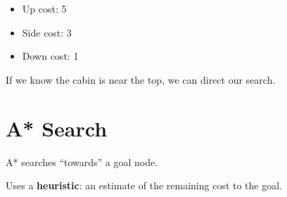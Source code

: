 \documentclass{article}
\begin{document}
\begin{itemize}[noitemsep]
    \item Up cost: 5
    \item Side cost: 3
    \item Down cost: 1
\end{itemize}

If we know the cabin is near the top, we can direct our search.

\section{A* Search}

A* searches ``towards'' a goal node.

Uses a \textbf{heuristic}: an estimate of the remaining cost to the goal.
\end{document}
